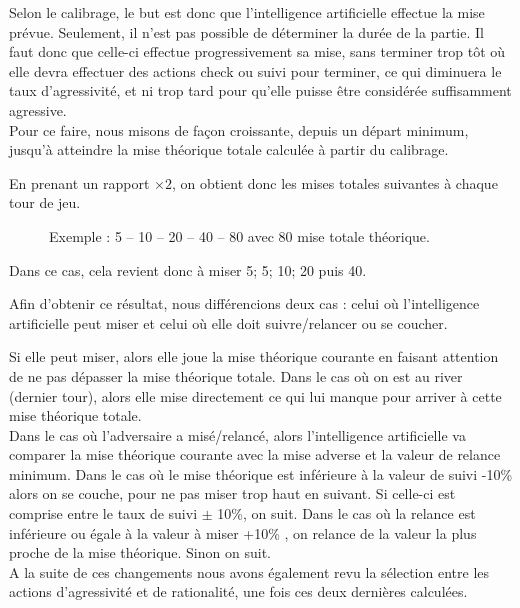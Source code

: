 \documentclass{report}
\begin{document}
Selon le calibrage, le but est donc que l'intelligence artificielle effectue la mise prévue. Seulement, il n'est pas possible de déterminer la durée de la partie. Il faut donc que celle-ci effectue progressivement sa mise, sans terminer trop tôt où elle devra effectuer des actions check ou suivi pour terminer, ce qui diminuera le taux d'agressivité, et ni trop tard pour qu'elle puisse être considérée suffisamment agressive.\\

Pour ce faire, nous misons de façon croissante, depuis un départ minimum, jusqu'à atteindre la mise théorique totale calculée à partir du calibrage.\par
En prenant un rapport $\times2$, on obtient donc les mises totales suivantes à chaque tour de jeu.\par

\begin{figure}[H]
\begin{center}
Exemple : 	5 – 10 – 20 – 40 – 80 		avec 80 mise totale théorique.
\end{center}
\end{figure}
Dans ce cas, cela revient donc à miser 5; 5; 10; 20 puis 40.

Afin d'obtenir ce résultat, nous différencions deux cas : celui où l'intelligence artificielle peut miser et celui où elle doit suivre/relancer ou se coucher.\par
Si elle peut miser, alors elle joue la mise théorique courante en faisant attention de ne pas dépasser la mise théorique totale. Dans le cas où on est au river (dernier tour), alors elle mise directement ce qui lui manque pour arriver à cette mise théorique totale.\\

Dans le cas où l'adversaire a misé/relancé, alors l'intelligence artificielle va comparer la mise théorique courante avec la mise adverse et la valeur de relance minimum. Dans le cas où le mise théorique est inférieure à la valeur de suivi -10\% alors on se couche, pour ne  pas miser trop haut en suivant. Si celle-ci est comprise entre le taux de suivi $\pm$ 10\%, on suit.
Dans le cas où la relance est inférieure ou égale à la valeur à miser +10\% , on relance de la valeur la plus proche de la mise théorique. Sinon on suit.\\


A la suite de ces changements nous avons également revu la sélection entre les actions d'agressivité et de rationalité, une fois ces deux dernières calculées.\par
\end{document}
